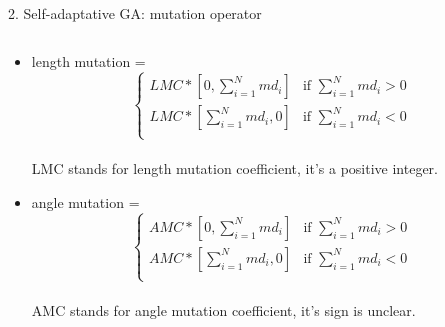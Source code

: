 \documentclass{beamer}
\begin{document}
\begin{frame}{2. Self-adaptative GA:  mutation operator}
    \begin{columns}[c]
	\begin{column}{1\textwidth}
		\begin{itemize}
			\item length mutation =  
				\[
				  \begin{cases}
					  LMC*[0, \sum_{i=1}^{N}{md_i}] & \text{if $\sum_{i=1}^{N}{md_i} > 0$} \\
					  LMC*[\sum_{i=1}^{N}{md_i}, 0] & \text{if $\sum_{i=1}^{N}{md_i} < 0$} \\
				  \end{cases}
				\] \\
				LMC stands for length mutation coefficient, it's a positive integer.
			\item angle mutation = 
				\[
				  \begin{cases}
					  AMC*[0, \sum_{i=1}^{N}{md_i}] & \text{if $\sum_{i=1}^{N}{md_i} > 0$} \\
					  AMC*[\sum_{i=1}^{N}{md_i}, 0] & \text{if $\sum_{i=1}^{N}{md_i} < 0$} \\
				  \end{cases}
				\] \\
				AMC stands for angle mutation coefficient, it's sign is unclear.
		\end{itemize}
	\end{column}
\end{columns}
\end{frame}
\end{document}
